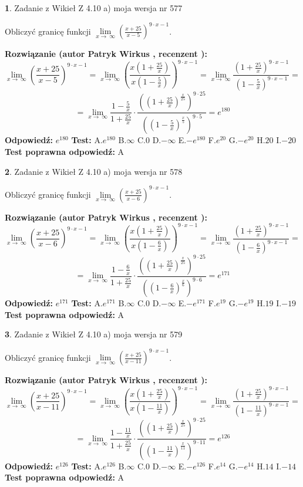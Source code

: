 \documentclass[12pt, a4paper]{article}
\theoremstyle{definition} %
\newtheorem{zad}{}
\newcommand{\zadStart}[1]{\begin{zad}#1\newline}
\newcommand{\zadStop}{\end{zad}}
\newcommand{\rozwStart}[2]{\noindent \textbf{Rozwiązanie (autor #1 , recenzent #2): }\newline}
\newcommand{\rozwStop}{\newline}
\newcommand{\odpStart}{\noindent \textbf{Odpowiedź:}\newline}
\newcommand{\odpStop}{\newline}
\newcommand{\testStart}{\noindent \textbf{Test:}\newline}
\newcommand{\testStop}{\newline}
\newcommand{\kluczStart}{\noindent \textbf{Test poprawna odpowiedź:}\newline}
\newcommand{\kluczStop}{\newline}
\begin{document}
\zadStart{Zadanie z Wikieł Z 4.10 a) moja wersja nr 577}

Obliczyć granicę funkcji  $\lim\limits_{x\to\ \infty}(\frac{x+25}{x-5})^{9\cdot x-1}$.
\zadStop
\rozwStart{Patryk Wirkus}{}
$$\lim\limits_{x\to\ \infty}(\frac{x+25}{x-5})^{9\cdot x-1} = \lim\limits_{x\to\ \infty}(\frac{x(1+\frac{25}{x})}{x(1-\frac{5}{x})})^{9\cdot x-1}=\lim\limits_{x\to\ \infty}\frac{(1+\frac{25}{x})^{9\cdot x-1}}{(1-\frac{5}{x})^{9\cdot x-1}}=$$
$$=\lim\limits_{x\to\ \infty}\frac{1-\frac{5}{x}}{1+\frac{25}{x}}\cdot\frac{((1+\frac{25}{x})^{\frac{x}{25}})^{9\cdot25}}{((1-\frac{5}{x})^{\frac{x}{5}})^{9\cdot5}}=e^{180}$$
\rozwStop
\odpStart
$e^{180}$
\odpStop
\testStart
A.$e^{180}$ B.$\infty$ C.$0$ D.$-\infty$ E.$-e^{180}$
F.$e^{20}$ G.$-e^{20}$
H.$20$
I.$-20$
\testStop
\kluczStart
A
\kluczStop



\zadStart{Zadanie z Wikieł Z 4.10 a) moja wersja nr 578}

Obliczyć granicę funkcji  $\lim\limits_{x\to\ \infty}(\frac{x+25}{x-6})^{9\cdot x-1}$.
\zadStop
\rozwStart{Patryk Wirkus}{}
$$\lim\limits_{x\to\ \infty}(\frac{x+25}{x-6})^{9\cdot x-1} = \lim\limits_{x\to\ \infty}(\frac{x(1+\frac{25}{x})}{x(1-\frac{6}{x})})^{9\cdot x-1}=\lim\limits_{x\to\ \infty}\frac{(1+\frac{25}{x})^{9\cdot x-1}}{(1-\frac{6}{x})^{9\cdot x-1}}=$$
$$=\lim\limits_{x\to\ \infty}\frac{1-\frac{6}{x}}{1+\frac{25}{x}}\cdot\frac{((1+\frac{25}{x})^{\frac{x}{25}})^{9\cdot25}}{((1-\frac{6}{x})^{\frac{x}{6}})^{9\cdot6}}=e^{171}$$
\rozwStop
\odpStart
$e^{171}$
\odpStop
\testStart
A.$e^{171}$ B.$\infty$ C.$0$ D.$-\infty$ E.$-e^{171}$
F.$e^{19}$ G.$-e^{19}$
H.$19$
I.$-19$
\testStop
\kluczStart
A
\kluczStop



\zadStart{Zadanie z Wikieł Z 4.10 a) moja wersja nr 579}

Obliczyć granicę funkcji  $\lim\limits_{x\to\ \infty}(\frac{x+25}{x-11})^{9\cdot x-1}$.
\zadStop
\rozwStart{Patryk Wirkus}{}
$$\lim\limits_{x\to\ \infty}(\frac{x+25}{x-11})^{9\cdot x-1} = \lim\limits_{x\to\ \infty}(\frac{x(1+\frac{25}{x})}{x(1-\frac{11}{x})})^{9\cdot x-1}=\lim\limits_{x\to\ \infty}\frac{(1+\frac{25}{x})^{9\cdot x-1}}{(1-\frac{11}{x})^{9\cdot x-1}}=$$
$$=\lim\limits_{x\to\ \infty}\frac{1-\frac{11}{x}}{1+\frac{25}{x}}\cdot\frac{((1+\frac{25}{x})^{\frac{x}{25}})^{9\cdot25}}{((1-\frac{11}{x})^{\frac{x}{11}})^{9\cdot11}}=e^{126}$$
\rozwStop
\odpStart
$e^{126}$
\odpStop
\testStart
A.$e^{126}$ B.$\infty$ C.$0$ D.$-\infty$ E.$-e^{126}$
F.$e^{14}$ G.$-e^{14}$
H.$14$
I.$-14$
\testStop
\kluczStart
A
\kluczStop
\end{document}
